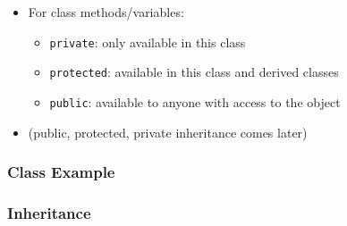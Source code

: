 \begin{itemize}
\itemsep1pt\parskip0pt
\item
  For class methods/variables:

  \begin{itemize}
  \itemsep1pt\parskip0pt
  \item
    \texttt{private}: only available in this class
  \item
    \texttt{protected}: available in this class and derived classes
  \item
    \texttt{public}: available to anyone with access to the object
  \end{itemize}
\item
  (public, protected, private inheritance comes later)
\end{itemize}

\subsubsection{Class Example}\label{class-example-1}

\begin{Shaded}
\begin{Highlighting}[]
 

\NormalTok{: }
      


   \NormalTok{;}
   \NormalTok{;}

   \NormalTok{+(} 

\NormalTok{: }
   
   
\NormalTok{\};}
\end{Highlighting}
\end{Shaded}

\subsubsection{Inheritance}\label{inheritance-1}

